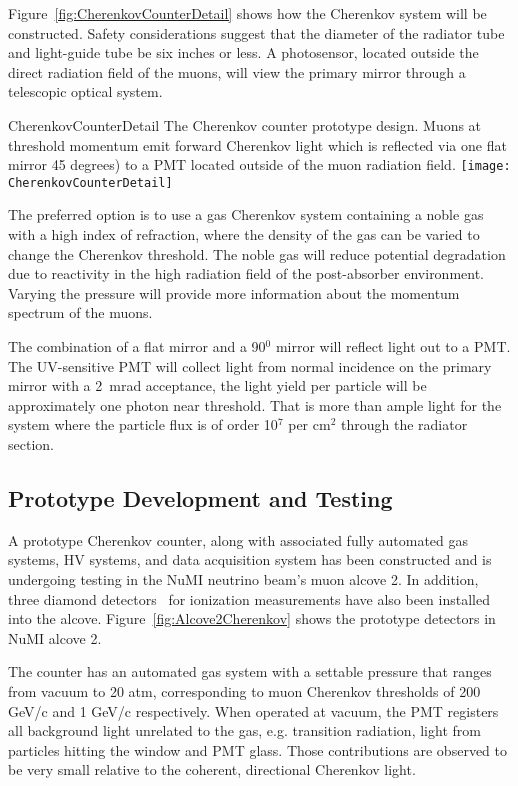 Figure~\ref{fig:CherenkovCounterDetail} shows how the
Cherenkov system will be constructed. Safety considerations suggest that the
diameter of the radiator tube and light-guide tube be six inches
or less.  A 
photosensor, located outside the direct radiation field of the muons, will
view the primary mirror through a telescopic optical system.

\begin{cdrfigure}[[Cherenkov counter design]{CherenkovCounterDetail}
{The Cherenkov counter prototype design. 
Muons at threshold momentum emit forward Cherenkov light which is
reflected via one flat mirror 45 degrees) to a PMT located outside of the muon
radiation field.}
\texttt{[image: CherenkovCounterDetail]}
\end{cdrfigure}

The preferred option is to use a gas Cherenkov system containing a
noble gas with a high index of refraction, where the density of the
gas can be varied to change the Cherenkov threshold. The noble gas
will reduce potential degradation due to reactivity in the high
radiation field of the post-absorber environment. Varying the pressure
will provide more information about the momentum spectrum of the
muons.

The combination of a flat mirror and a 90$^0$ mirror will reflect
light out to a PMT. The UV-sensitive PMT will collect light from
normal incidence on the primary mirror with a 2~mrad acceptance, the light
yield per particle will be approximately one photon near
threshold. That is more than ample light for the system where the
particle flux is of order 10$^7$ per cm$^2$ through the radiator section. 


\subsection{Prototype Development and Testing}
\label{subsec:nd-blm-muon-cherenkov-proto}

A prototype Cherenkov counter, along with associated fully automated gas systems,
HV systems, and data acquisition system has been constructed and is undergoing
testing in the NuMI neutrino beam's muon alcove 2. In addition, three diamond
detectors~\cite{ref:CERNdiamond} for ionization measurements have also been installed into the alcove.
Figure~\ref{fig:Alcove2Cherenkov} shows the prototype detectors in NuMI alcove 2.

The counter has an automated gas system with a settable pressure that ranges
from vacuum to 20 atm, corresponding to muon Cherenkov thresholds of 
200 GeV/c and 1 GeV/c respectively. When operated at vacuum, the PMT registers all background light
unrelated to the gas, e.g. transition radiation, light from particles hitting the window and PMT glass.
Those contributions are observed to be very small relative to the coherent, directional Cherenkov light.


